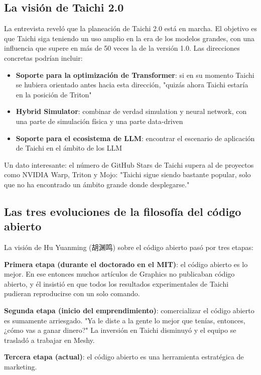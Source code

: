 \subsection{La visión de Taichi 2.0}

La entrevista reveló que la planeación de Taichi 2.0 está en marcha. El objetivo es que Taichi siga teniendo un uso amplio en la era de los modelos grandes, con una influencia que supere en más de 50 veces la de la versión 1.0. Las direcciones concretas podrían incluir:

\begin{itemize}
\item \textbf{Soporte para la optimización de Transformer}: si en su momento Taichi se hubiera orientado antes hacia esta dirección, "quizás ahora Taichi estaría en la posición de Triton"
\item \textbf{Hybrid Simulator}: combinar de verdad simulation y neural network, con una parte de simulación física y una parte data-driven
\item \textbf{Soporte para el ecosistema de LLM}: encontrar el escenario de aplicación de Taichi en el ámbito de los LLM
\end{itemize}

Un dato interesante: el número de GitHub Stars de Taichi supera al de proyectos como NVIDIA Warp, Triton y Mojo: "Taichi sigue siendo bastante popular, solo que no ha encontrado un ámbito grande donde desplegarse."

\subsection{Las tres evoluciones de la filosofía del código abierto}

La visión de Hu Yuanming (胡渊鸣) sobre el código abierto pasó por tres etapas:

\textbf{Primera etapa (durante el doctorado en el MIT)}: el código abierto es lo mejor. En ese entonces muchos artículos de Graphics no publicaban código abierto, y él insistió en que todos los resultados experimentales de Taichi pudieran reproducirse con un solo comando.

\textbf{Segunda etapa (inicio del emprendimiento)}: comercializar el código abierto es sumamente arriesgado. "Ya le diste a la gente lo mejor que tenías, entonces, ¿cómo vas a ganar dinero?" La inversión en Taichi disminuyó y el equipo se trasladó a trabajar en Meshy.

\textbf{Tercera etapa (actual)}: el código abierto es una herramienta estratégica de marketing.

